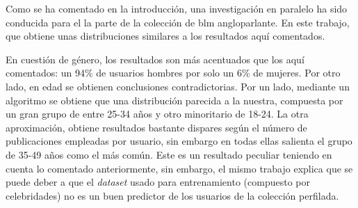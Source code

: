 Como se ha comentado en la introducción, una investigación en paralelo ha sido conducida para el la parte de la colección de \acrshort{blm} angloparlante. En este trabajo, \citet{rodriguez_bacelar_automatic_2023} que obtiene unas distribuciones similares a los resultados aquí comentados.

En cuestión de género, los resultados son más acentuados que los aquí comentados: un 94\% de usuarios hombres por solo un 6\% de mujeres. Por otro lado, en edad se obtienen conclusiones contradictorias. Por un lado, mediante un algoritmo se obtiene que una distribución parecida a la nuestra, compuesta por un gran grupo de entre 25-34 años y otro minoritario de 18-24. La otra aproximación, obtiene resultados bastante dispares según el número de publicaciones empleadas por usuario, sin embargo en todas ellas salienta el grupo de 35-49 años como el más común. Este es un resultado peculiar teniendo en cuenta lo comentado anteriormente, sin embargo, el mismo trabajo explica que se puede deber a que el \textit{dataset} usado para entrenamiento (compuesto por celebridades) no es un buen predictor de los usuarios de la colección perfilada.